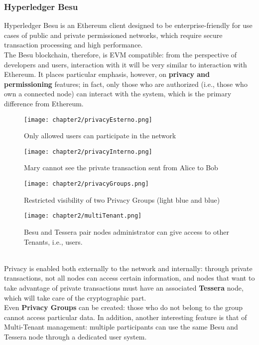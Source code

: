 \subsubsection{Hyperledger Besu}
Hyperledger Besu is an Ethereum client designed to be enterprise-friendly for use cases 
of public and private permissioned networks, which require secure transaction processing
and high performance.\\
The Besu blockchain, therefore, is EVM compatible: from the perspective of developers 
and users, interaction with it will be very similar to interaction with Ethereum. It 
places particular emphasis, however, on \textbf{privacy and permissioning} features; in fact, 
only those who are authorized (i.e., those who own a connected node) can interact with 
the system, which is the primary difference from Ethereum.
\begin{figure}[!htb]
    \begin{minipage}{0.48\textwidth}
        \centering
        \texttt{[image: chapter2/privacyEsterno.png]}
        \caption{Only allowed users can participate in the network}
    \end{minipage}\hfill
    \begin{minipage}{0.48\textwidth}
        \centering
        \texttt{[image: chapter2/privacyInterno.png]}
        \caption{Mary cannot see the private transaction sent from Alice to Bob}
    \end{minipage}
\end{figure}
\begin{figure}[!htb]
    \begin{minipage}{0.48\textwidth}
        \centering
        \texttt{[image: chapter2/privacyGroups.png]}
        \caption{Restricted visibility of two Privacy Groups (light blue and blue)}
    \end{minipage}\hfill
    \begin{minipage}{0.48\textwidth}
        \centering
        \texttt{[image: chapter2/multiTenant.png]}
        \caption{Besu and Tessera pair nodes administrator can give access to other Tenants, i.e., users.}
    \end{minipage}
\end{figure}\\
Privacy is enabled both externally to the network and internally: through private 
transactions, not all nodes can access certain information, and nodes that want to 
take advantage of private transactions must have an associated \textbf{Tessera} node, which 
will take care of the cryptographic part.\\
Even \textbf{Privacy Groups} can be created: those who do not belong to the group cannot access 
particular data. In addition, another interesting feature is that of Multi-Tenant 
management: multiple participants can use the same Besu and Tessera node through a 
dedicated user system.

